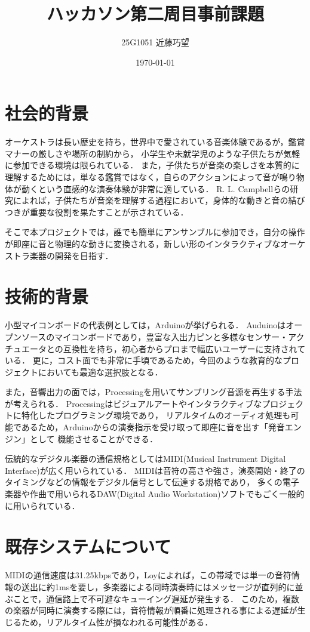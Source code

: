 \documentclass[uplatex,dvipdfmx]{jsarticle}
\begin{document}
\title{ハッカソン第二周目事前課題}
\author{25G1051 近藤巧望}
\date{\today}
\maketitle

\section{社会的背景}
オーケストラは長い歴史を持ち，世界中で愛されている音楽体験であるが，鑑賞マナーの厳しさや場所の制約から，
小学生や未就学児のような子供たちが気軽に参加できる環境は限られている．
また，子供たちが音楽の楽しさを本質的に理解するためには，単なる鑑賞ではなく，自らのアクションによって音が鳴り物体が動くという直感的な演奏体験が非常に適している．
R. L. Campbellらの研究によれば，子供たちが音楽を理解する過程において，身体的な動きと音の結びつきが重要な役割を果たすことが示されている\cite{Campbell2010}．

そこで本プロジェクトでは，誰でも簡単にアンサンブルに参加でき，自分の操作が即座に音と物理的な動きに変換される，新しい形のインタラクティブなオーケストラ楽器の開発を目指す．

\section{技術的背景}
小型マイコンボードの代表例としては，Arduinoが挙げられる．
Auduinoはオープンソースのマイコンボードであり，豊富な入出力ピンと多様なセンサー・アクチュエータとの互換性を持ち，初心者からプロまで幅広いユーザーに支持されている．
更に，コスト面でも非常に手頃であるため，今回のような教育的なプロジェクトにおいても最適な選択肢となる．

また，音響出力の面では，Processingを用いてサンプリング音源を再生する手法が考えられる．
Processingはビジュアルアートやインタラクティブなプロジェクトに特化したプログラミング環境であり，
リアルタイムのオーディオ処理も可能であるため，Arduinoからの演奏指示を受け取って即座に音を出す「発音エンジン」として
機能させることができる．

伝統的なデジタル楽器の通信規格としてはMIDI(Musical Instrument Digital Interface)が広く用いられている．
MIDIは音符の高さや強さ，演奏開始・終了のタイミングなどの情報をデジタル信号として伝達する規格であり，
多くの電子楽器や作曲で用いられるDAW(Digital Audio Workstation)ソフトでもごく一般的に用いられている．

\section{既存システムについて}
MIDIの通信速度は31.25kbpsであり，Loyによれば，この帯域では単一の音符情報の送出に約1msを要し，多楽器による同時演奏時にはメッセージが直列的に並ぶことで，通信路上で不可避なキューイング遅延が発生する\cite{loy1985}．
このため，複数の楽器が同時に演奏する際には，音符情報が順番に処理される事による遅延が生じるため，リアルタイム性が損なわれる可能性がある．
\end{document}
